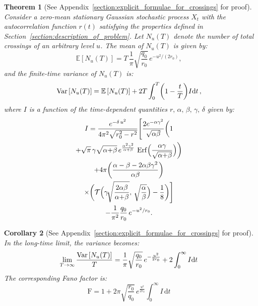 \documentclass[journal]{IEEEtran}
\theoremstyle{plain}
\newtheorem{theorem}{Theorem}[section]
\newtheorem{corollary}[theorem]{Corollary}
\theoremstyle{definition}
\theoremstyle{remark}
\newcommand{\E}{\mathbb{E}}
\newcommand{\FF}{\mathrm{F}}
\newcommand{\Ot}{\mathcal{T}}
\newcommand{\Erf}{\operatorname{Erf}}
\newcommand{\Nu}{N_u(T)}
\newcommand{\dd}{\mathrm{d}}
\begin{document}
\begin{theorem}[See Appendix~\ref{section:explicit_formulae_for_crossings} for proof]
\label{thrm:main_theorem_crossing}
Consider a zero-mean stationary Gaussian stochastic process $X_t$ with the autocorrelation function $r(t)$ satisfying the properties defined in Section~\ref{section:description_of_problem}. Let $\Nu$ denote the number of total crossings of an arbitrary level $u$.
The mean of $\Nu$ is given by:
\begin{equation}
    \E\left[\Nu\right] = T\, \frac{1}{\pi}\sqrt{\frac{q_0}{r_0}} \, e^{-u^2/(2r_0)}, \label{eq:rice_formula_gaussian_cross}
\end{equation}
and the finite-time variance of $\Nu$ is:
\begin{equation}
    \textnormal{Var}\left[\Nu\right] = \E\left[\Nu\right] + 2T \int_{0}^T \biggl(1-\frac{t}{T}\biggr)  I  \dd t\,, \label{eq:variance_finite_time_final_cross}
\end{equation}
where $I$ is a function of the time-dependent quantities $r, \, \alpha, \, \beta, \, \gamma, \, \delta$ given by:
\begin{multline}
    I = \frac{e^{-\delta\,u^2}}{4\pi^2\sqrt{r_0^2-r^2}} \Biggl[\frac{2e^{-\alpha \gamma^2}}{\sqrt{\alpha\beta}} \biggl(1 \\
    + \sqrt{\pi} \, \gamma \sqrt{\alpha{+}\beta} \, e^{\frac{\alpha^2 \gamma^2}{\alpha + \beta}} \, \Erf\Bigl(\frac{\alpha \gamma}{\sqrt{\alpha{+}\beta}}\Bigr)\biggr) \\
    + 4\pi \biggl(\frac{\alpha - \beta - 2\alpha \beta \gamma^2}{\alpha\beta}\biggr) \\
    \times\biggl(\Ot\Bigl(\gamma\!\sqrt{\frac{2\alpha\beta}{\alpha{+}\beta}},\, \sqrt{\frac{\alpha}{\beta}}\Bigr)-\frac{1}{8}\biggr)\Biggr] \\
    - \frac{1}{\pi^2}\frac{q_0}{r_0}\,e^{-u^2/r_0}.
\label{eq:I_final_result_owensT_crossing_main}
\end{multline}
\end{theorem}





\begin{corollary}[See Appendix~\ref{section:explicit_formulae_for_crossings} for proof]
In the long-time limit, the variance becomes:
\begin{equation}
    \lim_{T\rightarrow\infty}\frac{\textnormal{Var}\left[\Nu\right]}{T} =  \frac{1}{\pi}\sqrt{\frac{q_0}{r_0}} \, e^{-\frac{u^2}{2r_0}} + 2 \int_{0}^\infty I \dd t \label{eq:variance_infinite_time_final_cross}
\end{equation}
The corresponding Fano factor is:
\begin{equation}
    \FF = 1 + 2 \pi \sqrt{\frac{r_0}{q_0}} \, e^{\frac{u^2}{2r_0}} \int_{0}^\infty I \, \dd t \label{eq:fano_factor_final_cross}
\end{equation}
\end{corollary}
\end{document}
